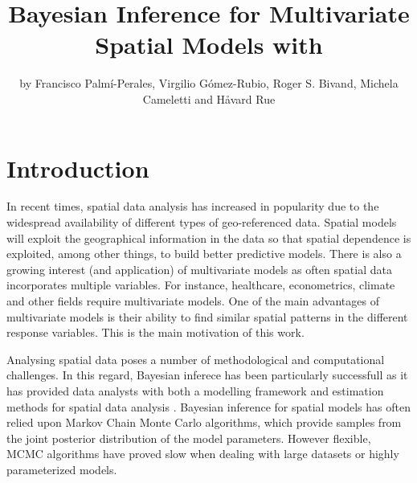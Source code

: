 \title{Bayesian Inference for Multivariate Spatial Models with  }%
\author{by Francisco Palm\'i-Perales, Virgilio G\'omez-Rubio, Roger S. Bivand, Michela Cameletti and H\aa{}vard Rue}

\maketitle



\section{Introduction}
\label{Introduction}

\medskip
In recent times, spatial data analysis has increased in popularity due to the
widespread availability of different types of geo-referenced data. Spatial
models will exploit the geographical information in the data so that spatial
dependence is exploited, among other things, to build better predictive models.
There is also a growing interest (and application) of multivariate models as
often spatial data incorporates multiple variables.  For instance, healthcare,
econometrics, climate and other fields require multivariate models. One of the
main advantages of multivariate models is their ability to find similar spatial
patterns in the different response variables. This is the main motivation of this work.

\medskip
Analysing spatial data poses a number of methodological and computational
challenges. In this regard, Bayesian inferece has been particularly successfull as it has provided data analysts with both a modelling framework and estimation methods
for spatial data analysis \citep[see, for example, ][]{banerjee2014hierarchical}. Bayesian inference for spatial models has often relied upon Markov Chain Monte Carlo \citep[MCMC, ][]{MCMC} algorithms, which provide samples from the 
joint posterior distribution of the model parameters. However flexible, MCMC
algorithms have proved slow when dealing with large datasets or highly parameterized models.

